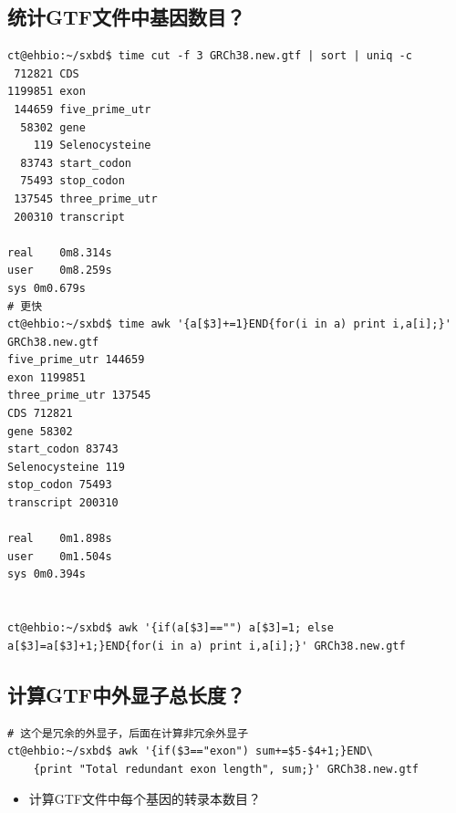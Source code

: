 \documentclass[]{article}
\providecommand{\tightlist}{%
  \setlength{\itemsep}{0pt}\setlength{\parskip}{0pt}}
\numberwithin{figure}{section}
\numberwithin{table}{section}
\begin{document}
\hypertarget{gtf_num_gene}{%
\subsection{统计GTF文件中基因数目？}\label{gtf_num_gene}}

\begin{verbatim}
ct@ehbio:~/sxbd$ time cut -f 3 GRCh38.new.gtf | sort | uniq -c
 712821 CDS
1199851 exon
 144659 five_prime_utr
  58302 gene
    119 Selenocysteine
  83743 start_codon
  75493 stop_codon
 137545 three_prime_utr
 200310 transcript

real	0m8.314s
user	0m8.259s
sys	0m0.679s
# 更快
ct@ehbio:~/sxbd$ time awk '{a[$3]+=1}END{for(i in a) print i,a[i];}' GRCh38.new.gtf
five_prime_utr 144659
exon 1199851
three_prime_utr 137545
CDS 712821
gene 58302
start_codon 83743
Selenocysteine 119
stop_codon 75493
transcript 200310

real	0m1.898s
user	0m1.504s
sys	0m0.394s


ct@ehbio:~/sxbd$ awk '{if(a[$3]=="") a[$3]=1; else a[$3]=a[$3]+1;}END{for(i in a) print i,a[i];}' GRCh38.new.gtf
\end{verbatim}

\hypertarget{gtf_exon_length}{%
\subsection{计算GTF中外显子总长度？}\label{gtf_exon_length}}

\begin{verbatim}
# 这个是冗余的外显子，后面在计算非冗余外显子
ct@ehbio:~/sxbd$ awk '{if($3=="exon") sum+=$5-$4+1;}END\
	{print "Total redundant exon length", sum;}' GRCh38.new.gtf
\end{verbatim}

\begin{itemize}
\tightlist
\item
  计算GTF文件中每个基因的转录本数目？
\end{itemize}
\end{document}
